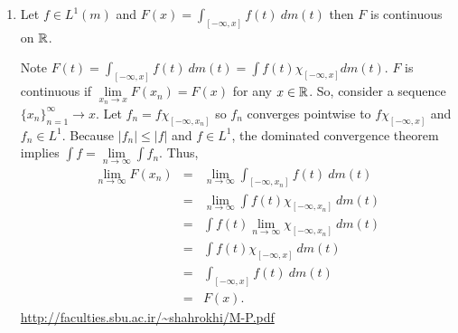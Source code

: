 \begin{enumerate}
\item Let $f \in L^1(m)$ and $F(x)= \int_{[-\infty, x]}f(t)\ dm(t)$ then $F$ is continuous on ${\mathbb R}$. 
\begin{pf}
Note $F(t) = \int_{[-\infty, x]}f(t)\ dm(t)= \int f(t)\chi_{[-\infty, x]} dm(t)$. $F$ is continuous if $\lim\limits_{x_n \rightarrow x}F(x_n)=F(x)$ for any $x \in {\mathbb R}$. So, consider a sequence $\{x_n\}_{n=1}^\infty \rightarrow x$. Let $f_n=f\chi_{[-\infty, x_n]}$ so $f_n$ converges pointwise to $f\chi_{[-\infty, x]}$ and $f_n \in L^1$. Because $|f_n|\leq |f|$ and $f \in L^1$, the dominated convergence theorem implies $\int f = \lim\limits_{n \rightarrow \infty}\int f_n$.  Thus, 
\begin{eqnarray*}
\lim\limits_{n\rightarrow \infty} F(x_n) & = & \lim\limits_{n\rightarrow \infty} \int_{[-\infty, x_n]}f(t)\ dm(t)\\
& = & \lim\limits_{n\rightarrow \infty} \int f(t) \chi_{[-\infty, x_n]}\ dm(t)\\
&=& \int f(t)\lim\limits_{n\rightarrow \infty} \chi_{[-\infty, x_n]}\ dm(t)\\
&=& \int f(t)\chi_{[-\infty, x]}\ dm(t)\\
&=& \int_{[-\infty, x]} f(t)\ dm(t)\\
& = & F(x).
\end{eqnarray*}
\url{http://faculties.sbu.ac.ir/~shahrokhi/M-P.pdf}
\end{pf}


\end{enumerate}
